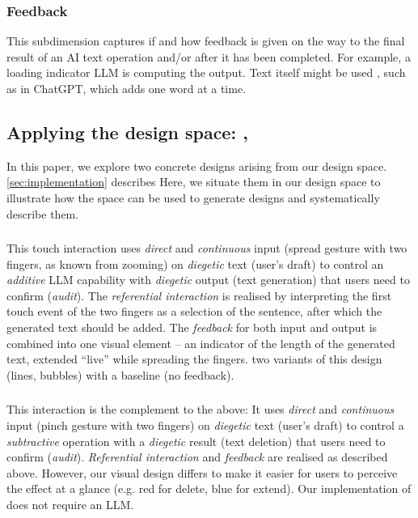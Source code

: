 \subsubsection{Feedback} 
This subdimension captures if and how feedback is given on the way to the final result of an AI text operation and/or after it has been completed. For example, a loading indicator  LLM is computing the output. Text itself might be used , such as in ChatGPT, which adds one word at a time.


\subsection{Applying the design space: \Spread{}, \Pinch{}}
\label{sec:ds_applied}

In this paper, we explore two concrete designs arising from our design space. \cref{sec:implementation} describes  Here, we situate them in our design space to illustrate how the space can be used to generate designs and systematically describe them. %

\subsubsection{\Spread{}}
This touch interaction uses \textit{direct} and \textit{continuous} input (spread gesture with two fingers, as known from zooming) on \textit{diegetic} text (user's draft) to control an \textit{additive} LLM capability with \textit{diegetic} output (text generation) that users need to confirm (\textit{audit}). 
The \textit{referential interaction} is realised by interpreting the first touch event of the two fingers as a selection of the sentence, after which the generated text should be added.
The \textit{feedback} for both input and output is combined into one visual element -- an indicator of the length of the generated text, extended ``live'' while spreading the fingers.  two variants of this design (lines, bubbles) with a baseline (no feedback).


\subsubsection{\Pinch{}}
This interaction is the complement to the above: It uses \textit{direct} and \textit{continuous} input (pinch gesture with two fingers) on \textit{diegetic} text (user's draft) to control a \textit{subtractive} operation with a \textit{diegetic} result (text deletion) that users need to confirm (\textit{audit}). 
\textit{Referential interaction} and \textit{feedback} are realised as described above. However, our visual design differs to make it easier for users to perceive the effect at a glance (e.g. red for delete, blue for extend). Our implementation of \pinch{} does not require an LLM.





